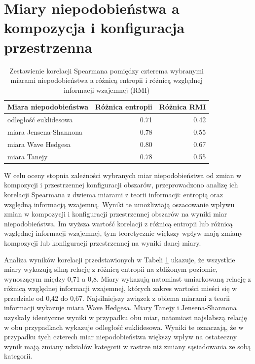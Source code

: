 \documentclass{amuthesis}
\begin{document}
\hypertarget{miary-niepodobieux144stwa-a-kompozycja-i-konfiguracja-przestrzenna}{%
\section{Miary niepodobieństwa a kompozycja i konfiguracja
przestrzenna}\label{miary-niepodobieux144stwa-a-kompozycja-i-konfiguracja-przestrzenna}}

\hypertarget{tbl-cztery_miary_ent_relmutinf}{}
\begin{table}
\caption{\label{tbl-cztery_miary_ent_relmutinf}Zestawienie korelacji Spearmana pomiędzy czterema wybranymi miarami
niepodobieństwa a różnicą entropii i różnicą względnej informacji
wzajemnej (RMI) }\tabularnewline

\centering
\begin{tabular}{lrr}
\toprule
Miara niepodobieństwa & Różnica entropii & Różnica RMI\\
\midrule
odległość euklidesowa & 0.71 & 0.42\\
miara Jensena-Shannona & 0.78 & 0.55\\
miara Wave Hedgesa & 0.80 & 0.67\\
miara Tanejy & 0.78 & 0.55\\
\bottomrule
\end{tabular}
\end{table}

W celu oceny stopnia zależności wybranych miar niepodobieństwa od zmian
w kompozycji i przestrzennej konfiguracji obszarów, przeprowadzono
analizę ich korelacji Spearmana z dwiema miarami z teorii informacji:
entropią oraz względną informacją wzajemną. Wyniki te umożliwiają
oszacowanie wpływu zmian w kompozycji i konfiguracji przestrzennej
obszarów na wyniki miar niepodobieństwa. Im wyższa wartość korelacji z
różnicą entropii lub różnicą względnej informacji wzajemnej, tym
teoretycznie większy wpływ mają zmiany kompozycji lub konfiguracji
przestrzennej na wyniki danej miary.

Analiza wyników korelacji przedstawionych w Tabeli
\ref{tbl-cztery_miary_ent_relmutinf} ukazuje, że wszystkie miary
wykazują silną relację z różnicą entropii na zbliżonym poziomie,
wynoszącym między 0,71 a 0,8. Miary wykazują natomiast umiarkowaną
relację z różnicą względnej informacji wzajemnej, których zakres
wartości mieści się w przedziale od 0,42 do 0,67. Najsilniejszy związek
z obiema miarami z teorii informacji wykazuje miara Wave Hedgesa. Miary
Tanejy i Jensena-Shannona uzyskały identyczne wyniki w przypadku obu
miar, natomiast najsłabszą relację w obu przypadkach wykazuje odległość
euklidesowa. Wyniki te oznaczają, że w przypadku tych czterech miar
niepodobieństwa większy wpływ na ostateczny wynik mają zmiany udziałów
kategorii w rastrze niż zmiany sąsiadowania ze sobą kategorii.
\end{document}
